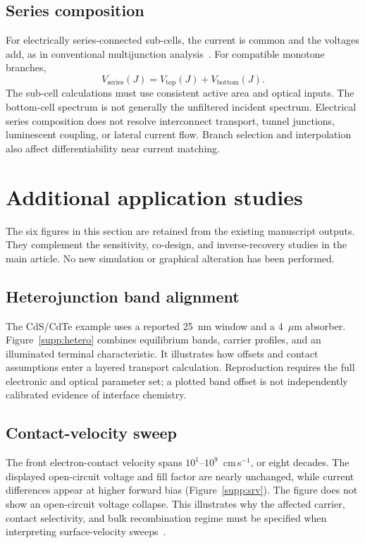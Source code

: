 \documentclass[11pt,a4paper]{article}
\numberwithin{equation}{section}
\begin{document}
\subsection{Series composition}
For electrically series-connected sub-cells, the current is common and
the voltages add, as in conventional multijunction
analysis~\cite{henry1980}. For compatible monotone branches,
\begin{equation}
V_{\mathrm{series}}(J)=V_{\mathrm{top}}(J)+V_{\mathrm{bottom}}(J).
\end{equation}
The sub-cell calculations must use consistent active area and optical
inputs. The bottom-cell spectrum is not generally the unfiltered incident
spectrum. Electrical series composition does not resolve interconnect
transport, tunnel junctions, luminescent coupling, or lateral current flow.
Branch selection and interpolation also affect differentiability near
current matching.

\section{Additional application studies}\label{supp:applications}
The six figures in this section are retained from the existing manuscript
outputs. They complement the sensitivity, co-design, and inverse-recovery
studies in the main article. No new simulation or graphical alteration
has been performed.

\subsection{Heterojunction band alignment}
The CdS/CdTe example uses a reported 25~nm window and a 4~$\mu$m absorber.
Figure~\ref{supp:hetero} combines equilibrium bands, carrier profiles, and
an illuminated terminal characteristic. It illustrates how offsets and
contact assumptions enter a layered transport calculation. Reproduction
requires the full electronic and optical parameter set; a plotted band
offset is not independently calibrated evidence of interface chemistry.

\subsection{Contact-velocity sweep}
The front electron-contact velocity spans $10^1$--$10^9$~cm\,s$^{-1}$,
or eight decades. The displayed open-circuit voltage and fill factor are
nearly unchanged, while current differences appear at higher forward
bias (Figure~\ref{supp:srv}). The figure does not show an open-circuit
voltage collapse. This illustrates why the affected carrier, contact
selectivity, and bulk recombination regime must be specified when
interpreting surface-velocity sweeps~\cite{gaury2019}.
\end{document}
